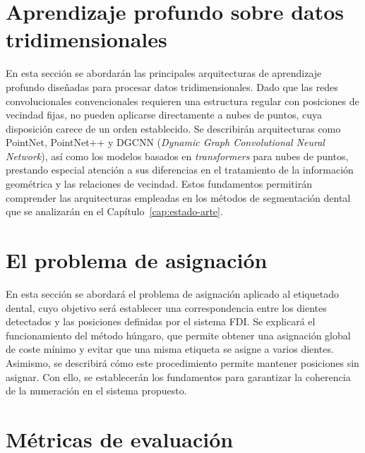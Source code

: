 \section{Aprendizaje profundo sobre datos tridimensionales}
\label{sec:aprendizaje-3d}

En esta sección se abordarán las principales arquitecturas de aprendizaje profundo diseñadas para procesar datos tridimensionales. Dado que las redes convolucionales convencionales requieren una estructura regular con posiciones de vecindad fijas, no pueden aplicarse directamente a nubes de puntos, cuya disposición carece de un orden establecido. Se describirán arquitecturas como PointNet, PointNet++ y DGCNN (\textit{Dynamic Graph Convolutional Neural Network}), así como los modelos basados en \textit{transformers} para nubes de puntos, prestando especial atención a sus diferencias en el tratamiento de la información geométrica y las relaciones de vecindad. Estos fundamentos permitirán comprender las arquitecturas empleadas en los métodos de segmentación dental que se analizarán en el Capítulo~\ref{cap:estado-arte}.

\section{El problema de asignación}
\label{sec:asignacion}

En esta sección se abordará el problema de asignación aplicado al etiquetado dental, cuyo objetivo será establecer una correspondencia entre los dientes detectados y las posiciones definidas por el sistema FDI. Se explicará el funcionamiento del método húngaro, que permite obtener una asignación global de coste mínimo y evitar que una misma etiqueta se asigne a varios dientes. Asimismo, se describirá cómo este procedimiento permite mantener posiciones sin asignar. Con ello, se establecerán los fundamentos para garantizar la coherencia de la numeración en el sistema propuesto.

\section{Métricas de evaluación}
\label{sec:metricas}

